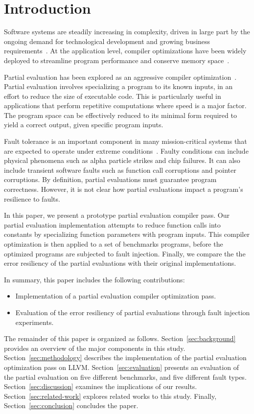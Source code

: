 \section{Introduction}

Software systems are steadily increasing in complexity, driven in large part by the ongoing demand for technological development and growing business requirements~\cite{Lyu}. 
At the application level, compiler optimizations have been widely deployed to streamline program performance and conserve memory space~\cite{Zhou}.

Partial evaluation has been explored as an aggressive compiler optimization~\cite{Jones1993}.
Partial evaluation involves specializing a program to its known inputs, in an effort to reduce the size of executable code. 
This is particularly useful in applications that perform repetitive computations where speed is a major factor.  
The program space can be effectively reduced to its minimal form required to yield a correct output, given specific program inputs.

Fault tolerance is an important component in many mission-critical systems that are expected to operate under extreme conditions~\cite{Somani}.
Faulty conditions can include physical phenomena such as alpha particle strikes and chip failures.
It can also include transient software faults such as function call corruptions and pointer corruptions. 
By definition, partial evaluations must guarantee program correctness.
However, it is not clear how partial evaluations impact a program's resilience to faults.

In this paper, we present a prototype partial evaluation compiler pass.
Our partial evaluation implementation attempts to reduce function calls into constants by specializing function parameters with program inputs.
This compiler optimization is then applied to a set of benchmarks programs, before the optimized programs are subjected to fault injection.
Finally, we compare the the error resiliency of the partial evaluations with their original implementations.

In summary, this paper includes the following contributions:
\begin{itemize}
\item Implementation of a partial evaluation compiler optimization pass. 
\item Evaluation of the error resiliency of partial evaluations through fault injection experiments.
\end{itemize}

\bigbreak

The remainder of this paper is organized as follows.
Section~\ref{sec:background} provides an overview of the major components in this study.
Section~\ref{sec:methodology} describes the implementation of the partial evaluation optimization pass on LLVM.
Section~\ref{sec:evaluation} presents an evaluation of the partial evaluation on five different benchmarks, and five different fault types.
Section~\ref{sec:discussion} examines the implications of our results.
Section~\ref{sec:related-work} explores related works to this study.
Finally, Section~\ref{sec:conclusion} concludes the paper.

